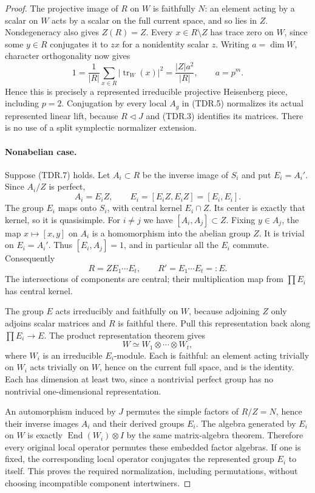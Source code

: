 \begin{proof}
The projective image of $R$ on $W$ is faithfully $N$: an element
acting by a scalar on $W$ acts by a scalar on the full current
space, and so lies in $Z$.  Nondegeneracy also gives $Z(R)=Z$.
Every $x\in R\setminus Z$ has trace zero on $W$, since some
$y\in R$ conjugates it to $zx$ for a nonidentity scalar $z$.
Writing $a=\dim W$, character orthogonality now gives
\[
 1=\frac1{|R|}\sum_{x\in R}|\operatorname{tr}_W(x)|^2
   =\frac{|Z|a^2}{|R|},\qquad a=p^m.
 \tag{TDR.10}
\]
Hence this is precisely a represented irreducible projective
Heisenberg piece, including $p=2$.  Conjugation by every local
$A_g$ in (TDR.5) normalizes its actual represented linear lift,
because $R\triangleleft J$ and (TDR.3) identifies its matrices.
There is no use of a split symplectic normalizer extension.

\paragraph{Nonabelian case.}
Suppose (TDR.7) holds.  Let $A_i\subset R$ be the inverse image
of $S_i$ and put $E_i=A_i'$.  Since $A_i/Z$ is perfect,
\[
 A_i=E_iZ,\qquad
 E_i=[E_iZ,E_iZ]=[E_i,E_i].
 \tag{TDR.11}
\]
The group $E_i$ maps onto $S_i$, with central kernel $E_i\cap Z$.
Its center is exactly that kernel, so it is quasisimple.
For $i\ne j$ we have $[A_i,A_j]\subset Z$.  Fixing $y\in A_j$,
the map $x\mapsto[x,y]$ on $A_i$ is a homomorphism into the
abelian group $Z$.  It is trivial on $E_i=A_i'$.  Thus
$[E_i,A_j]=1$, and in particular all the $E_i$ commute.
Consequently
\[
              R=Z E_1\cdots E_t,
              \qquad R'=E_1\cdots E_t=:E.
 \tag{TDR.12}
\]
The intersections of components are central; their multiplication
map from $\prod E_i$ has central kernel.

The group $E$ acts irreducibly and faithfully on $W$, because
adjoining $Z$ only adjoins scalar matrices and $R$ is faithful
there.  Pull this representation back along $\prod E_i\to E$.
The product representation theorem
\cite[Section~3.2, Theorem~10 and proof, pp.~27--28]{OG:Serre1977}
gives
\[
                   W\simeq W_1\otimes\cdots\otimes W_t,
 \tag{TDR.13}
\]
where $W_i$ is an irreducible $E_i$-module.  Each is faithful:
an element acting trivially on $W_i$ acts trivially on $W$, hence
on the current full space, and is the identity.  Each has
dimension at least two, since a nontrivial perfect group has no
nontrivial one-dimensional representation.

An automorphism induced by $J$ permutes the simple factors of
$R/Z=N$, hence their inverse images $A_i$ and their derived
groups $E_i$.  The algebra generated by $E_i$ on $W$ is exactly
$\operatorname{End}(W_i)\otimes I$ by the same matrix-algebra
theorem.  Therefore every original local operator permutes these
embedded factor algebras.  If one is fixed, the corresponding
local operator conjugates the represented group $E_i$ to itself.
This proves the required normalization, including permutations,
without choosing incompatible component intertwiners.


\end{proof}

